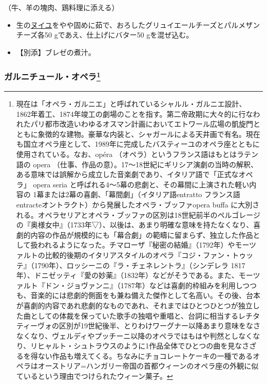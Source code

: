 \begin{recette}
（牛、羊の塊肉、鶏料理に添える）

\begin{itemize}
\item
  生の\protect\hyperlink{nouilles}{ヌイユ}をやや固めに茹で、おろしたグリュイエールチーズとパルメザンチーズ各50
  gであえ、仕上げにバター50 gを混ぜ込む。
\item
  【別添】ブレゼの煮汁。
\end{itemize}

\atoaki{}

\hypertarget{garniture-opera}{%
\subsubsection[ガルニチュール・オペラ]{\texorpdfstring{ガルニチュール・オペラ\footnote{現在は「オペラ・ガルニエ」と呼ばれているシャルル・ガルニエ設計、
  1862年着工、1874年竣工の劇場のことを指す。第二帝政期に大々的に行なわれたパリ都市改造いわゆるオスマン計画においてエトワール広場の凱旋門とともに象徴的な建物。豪華な内装と、シャガールによる天井画で有名。現在も国立オペラ座として、1989年に完成したバスティーユのオペラ座とともに使用されている。なお、opéra
  （オペラ）というフランス語はもとはラテン語の opera
  （仕事、作品の意）。17〜18世紀にギリシア演劇の当時の解釈、ある意味では誤解から成立した音楽劇であり、イタリア語で「正式なオペラ」
  opera seria と呼ばれる4〜5幕の悲劇と、その幕間に上演された軽い内容の
  1幕または2幕の喜劇、「幕間劇」（イタリア語entratto フランス語
  entracteオントラクト）から発展したオペラ・ブッファopera buffa
  に大別される。オペラセリアとオペラ・ブッファの区別は18世紀前半のペルゴレージの『奥様女中』（1733年▽）、以後は、あまり明確な意味を持たなくなり、喜劇的内容の作品が規模的にも「幕合劇」の範疇に留まらず、独立した作品として扱われるようになった。チマローザ『秘密の結婚』（1792年）やモーツァルトの比較的後期のイタリアスタイルのオペラ『コジ・ファン・トゥッテ』（1790年）、ロッシーニの『ラ・チェネレントラ』（シンデレラ
  1817年）、ドニゼッティ『愛の妙薬』（1832年）などがそうである。また、モーツァルト『ドン・ジョヴァンニ』（1787年）などは喜劇的枠組みを利用しつつも、音楽的には悲劇的側面をも兼ね備えた傑作として名高い。その後、台本が喜劇的内容であれ悲劇的なものであれ、それまではひとつひとつが独立した曲としての体裁を保っていた歌手の独唱や重唱と、台詞に相当するレチタティーヴォの区別が19世紀後半、とりわけワーグナー以降あまり意味をなさなくなり、ヴェルディやプッチーニ以降のオペラではもはや判然としなくなり、リヒャルト・シュトラウスのように1作品全体でひとつの曲を見なさざるを得ない作品も増えてくる。ちなみにチョコレートケーキの一種であるオペラはオーストリア=ハンガリー帝国の首都ウィーンのオペラ座の外観に似ているという理由でつけられたウィーン菓子。}}{ガルニチュール・オペラ}}\label{garniture-opera}}


\end{recette}
